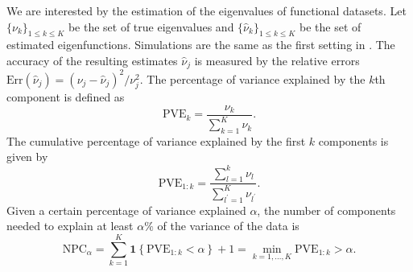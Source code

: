 We are interested by the estimation of the eigenvalues of functional datasets. Let $\{\nu_k\}_{1 \leq k \leq K}$ be the set of true eigenvalues and $\{\widehat{\nu}_k\}_{1 \leq k \leq K}$ be the set of estimated eigenfunctions. Simulations are the same as the first setting in \cite{happMultivariateFunctionalPrincipal2018a}. The accuracy of the resulting estimates $\widehat{\nu}_j$ is measured by the relative errors $\text{Err}(\widehat{\nu}_j)  = (\nu_j - \widehat{\nu}_j)^2 / \nu^2_j$. The percentage of variance explained by the $k$th component is defined as
\begin{equation}
     \text{PVE}_k = \frac{\nu_k}{\sum_{k = 1}^K \nu_k}.
\end{equation}
The cumulative percentage of variance explained by the first $k$ components is given by
\begin{equation}
     \text{PVE}_{1:k} = \frac{\sum_{l = 1}^k \nu_l}{\sum_{l^\prime = 1}^K \nu_{l^\prime}}.
\end{equation}
Given a certain percentage of variance explained $\alpha$, the number of components needed to explain at least $\alpha\%$ of the variance of the data is
\begin{equation}
     \text{NPC}_{\alpha} = \sum_{k = 1}^K \mathbf{1}\left\{\text{PVE}_{1:k} < \alpha\right\} + 1 = \min_{k = 1, \dots, K} \text{PVE}_{1:k} > \alpha.
\end{equation}

